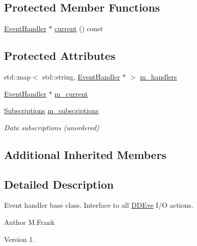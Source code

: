\subsection*{Protected Member Functions}
\begin{DoxyCompactItemize}
\item 
\hyperlink{class_d_d4hep_1_1_event_handler}{Event\+Handler} $\ast$ \hyperlink{class_d_d4hep_1_1_generic_event_handler_a4270bee117c5e39703a6f29e3e31d029}{current} () const
\end{DoxyCompactItemize}
\subsection*{Protected Attributes}
\begin{DoxyCompactItemize}
\item 
std\+::map$<$ std\+::string, \hyperlink{class_d_d4hep_1_1_event_handler}{Event\+Handler} $\ast$ $>$ \hyperlink{class_d_d4hep_1_1_generic_event_handler_ac699842a86c41b3b4e3424571d83790c}{m\+\_\+handlers}
\item 
\hyperlink{class_d_d4hep_1_1_event_handler}{Event\+Handler} $\ast$ \hyperlink{class_d_d4hep_1_1_generic_event_handler_a63ec98dd603fe8124e8afde68f36e37a}{m\+\_\+current}
\item 
\hyperlink{class_d_d4hep_1_1_generic_event_handler_a4b7fd1ba9fc0adab2fa1885162e69076}{Subscriptions} \hyperlink{class_d_d4hep_1_1_generic_event_handler_a3401232a3e8f43d779111f456176a3ba}{m\+\_\+subscriptions}
\begin{DoxyCompactList}\small\item\em Data subscriptions (unordered) \end{DoxyCompactList}\end{DoxyCompactItemize}
\subsection*{Additional Inherited Members}


\subsection{Detailed Description}
Event handler base class. Interface to all \hyperlink{struct_d_d4hep_1_1_d_d_eve}{D\+D\+Eve} I/O actions. 

\begin{DoxyAuthor}{Author}
M.\+Frank 
\end{DoxyAuthor}
\begin{DoxyVersion}{Version}
1. 
\end{DoxyVersion}


